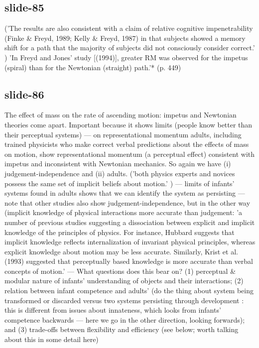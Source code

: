 \documentclass[12pt,\papersize]{extarticle}
\begin{document}
 
\subsection{slide-85}
\citep{freyd:1994_representational} ('The results are also consistent with a claim of relative cognitive impenetrability (Finke \& Freyd, 1989; Kelly \& Freyd, 1987) in that subjects showed a memory shift for a path that the majority of subjects did not consciously consider correct.' \citep[p.\ 975]{freyd:1994_representational})
'In Freyd and Jones’ study [(1994)], greater RM was observed for the impetus (spiral) than for the Newtonian (straight) path.'* (p. 449)
 
 
\subsection{slide-86}
The effect of mass on the rate of ascending motion: impetus and Newtonian theories come apart.
Important because it shows limits (people know better than their perceptual systems)
--- \citep{kozhevnikov:2001_impetus} on representational momentum
adults, including trained physicists who make correct verbal predictions about the effects of mass on motion, show representational momentum (a perceptual effect) consistent with impetus and inconsistent with Newtonian mechanics. So again we have (i) judgement-independence and (ii) adults. ('both physics experts and novices possess the same set of implicit beliefs about motion.' \citep[p.\ 451]{kozhevnikov:2001_impetus})
--- limits of infants' systems found in adults shows that we can identify the system as persisting
--- note that other studies also show judgement-independence, but in the other way (implicit knowledge of physical interactions more accurate than judgement: 'a number of previous studies suggesting a dissociation between explicit and implicit knowledge of the principles of physics. For instance, Hubbard suggests that implicit knowledge reflects internalization of invariant physical principles, whereas explicit knowledge about motion may be less accurate. Similarly, Krist et al. (1993) suggested that perceptually based knowledge is more accurate than verbal concepts of motion.' \citep[p.\ 450]{kozhevnikov:2001_impetus}
--- What questions does this bear on? (1) perceptual \& modular nature of infants' understanding of objects and their interactions; (2) relation between infant competence and adults' (do the thing about system being transformed or discarded versus two systems persisting through development : this is different from issues about innateness, which looks from infants' competence backwards --- here we go in the other direction, looking forwards); and (3) trade-offs between flexibility and efficiency (see below; worth talking about this in some detail here)
\end{document}

